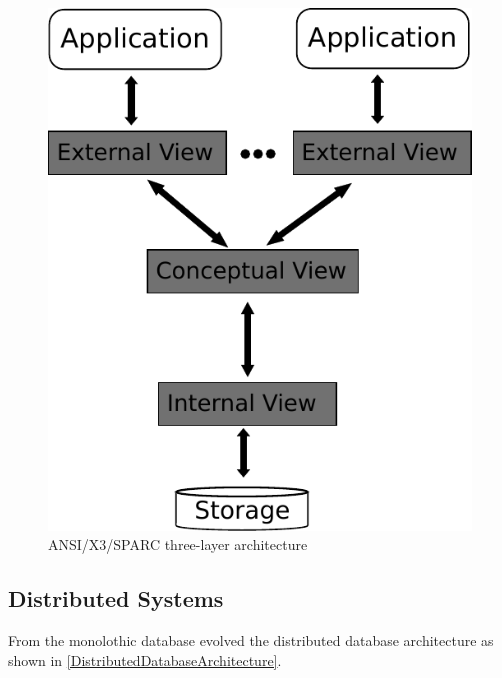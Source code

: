 \begin{figure}[H]
	\begin{center}
		\includegraphics[scale=0.5]{figures/monolithicalDatabaseArchitecture.pdf}
	\end{center}
	\caption{ANSI/X3/SPARC three-layer architecture \cite[p. 85]{DBLP:books/dp/LeserN2006}}
	\label{MonolithicDatabaseArchitecture}
\end{figure} 


\subsection{Distributed Systems}

From the monolothic database evolved the distributed database architecture as shown in \ref{DistributedDatabaseArchitecture}.

